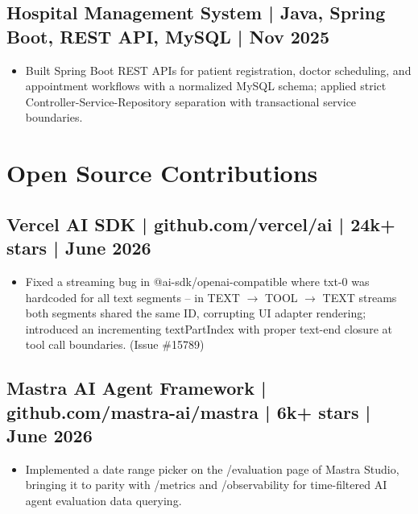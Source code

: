 \documentclass[11pt,letterpaper]{article}
\begin{document}
\subsection*{Hospital Management System | Java, Spring Boot, REST API, MySQL | Nov 2025}
\begin{itemize}
    \item Built Spring Boot REST APIs for patient registration, doctor scheduling, and appointment workflows with a normalized MySQL schema; applied strict Controller-Service-Repository separation with transactional service boundaries.
\end{itemize}

\section*{Open Source Contributions}

\subsection*{Vercel AI SDK | github.com/vercel/ai | 24k+ stars | June 2026}
\begin{itemize}
    \item Fixed a streaming bug in @ai-sdk/openai-compatible where txt-0 was hardcoded for all text segments -- in TEXT $\rightarrow$ TOOL $\rightarrow$ TEXT streams both segments shared the same ID, corrupting UI adapter rendering; introduced an incrementing textPartIndex with proper text-end closure at tool call boundaries. (Issue \#15789)
\end{itemize}

\subsection*{Mastra AI Agent Framework | github.com/mastra-ai/mastra | 6k+ stars | June 2026}
\begin{itemize}
    \item Implemented a date range picker on the /evaluation page of Mastra Studio, bringing it to parity with /metrics and /observability for time-filtered AI agent evaluation data querying.
\end{itemize}

\end{document}
